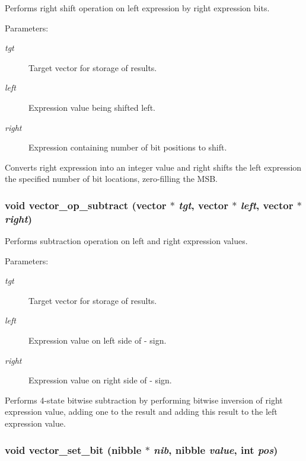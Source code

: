 Performs right shift operation on left expression by right expression bits. 

\begin{Desc}
\item[Parameters:]
\begin{description}
\item[{\em tgt}]Target vector for storage of results. \item[{\em left}]Expression value being shifted left. \item[{\em right}]Expression containing number of bit positions to shift.\end{description}
\end{Desc}
Converts right expression into an integer value and right shifts the left expression the specified number of bit locations, zero-filling the MSB. 
\subsubsection{\setlength{\rightskip}{0pt plus 5cm}void vector\_\-op\_\-subtract ({\bf vector} $\ast$ {\em tgt}, {\bf vector} $\ast$ {\em left}, {\bf vector} $\ast$ {\em right})}\label{vector_8c_a41}


Performs subtraction operation on left and right expression values. 

\begin{Desc}
\item[Parameters:]
\begin{description}
\item[{\em tgt}]Target vector for storage of results. \item[{\em left}]Expression value on left side of - sign. \item[{\em right}]Expression value on right side of - sign.\end{description}
\end{Desc}
Performs 4-state bitwise subtraction by performing bitwise inversion of right expression value, adding one to the result and adding this result to the left expression value. 
\subsubsection{\setlength{\rightskip}{0pt plus 5cm}void vector\_\-set\_\-bit ({\bf nibble} $\ast$ {\em nib}, {\bf nibble} {\em value}, int {\em pos})}\label{vector_8c_a19}


